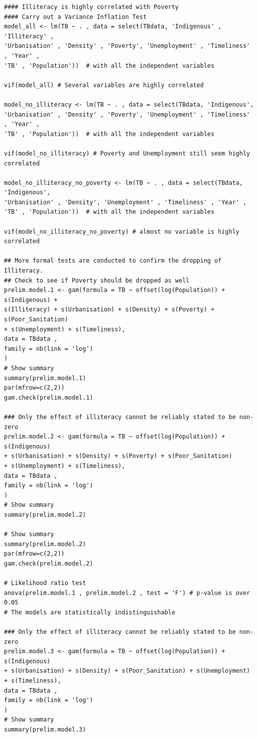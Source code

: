 \documentclass{article}
\begin{document}
\begin{verbatim}
#### Illiteracy is highly correlated with Poverty
#### Carry out a Variance Inflation Test
model_all <- lm(TB ~ . , data = select(TBdata, 'Indigenous' , 'Illiteracy' , 
'Urbanisation' , 'Density' , 'Poverty', 'Unemployment' , 'Timeliness' , 'Year' ,
'TB' , 'Population'))  # with all the independent variables

vif(model_all) # Several variables are highly correlated

model_no_illiteracy <- lm(TB ~ . , data = select(TBdata, 'Indigenous', 
'Urbanisation' , 'Density' , 'Poverty', 'Unemployment' , 'Timeliness' , 'Year' ,
'TB' , 'Population'))  # with all the independent variables

vif(model_no_illiteracy) # Poverty and Unemployment still seem highly correlated

model_no_illiteracy_no_poverty <- lm(TB ~ . , data = select(TBdata, 'Indigenous', 
'Urbanisation' , 'Density', 'Unemployment' , 'Timeliness' , 'Year' ,
'TB' , 'Population'))  # with all the independent variables

vif(model_no_illiteracy_no_poverty) # almost no variable is highly correlated

## More formal tests are conducted to confirm the dropping of Illiteracy.
## Check to see if Poverty should be dropped as well
prelim.model.1 <- gam(formula = TB ~ offset(log(Population)) + s(Indigenous) + 
s(Illiteracy) + s(Urbanisation) + s(Density) + s(Poverty) + s(Poor_Sanitation)
+ s(Unemployment) + s(Timeliness),
data = TBdata , 
family = nb(link = 'log')
)
# Show summary
summary(prelim.model.1)
par(mfrow=c(2,2))
gam.check(prelim.model.1)

### Only the effect of illiteracy cannot be reliably stated to be non-zero
prelim.model.2 <- gam(formula = TB ~ offset(log(Population)) + s(Indigenous) 
+ s(Urbanisation) + s(Density) + s(Poverty) + s(Poor_Sanitation)
+ s(Unemployment) + s(Timeliness),
data = TBdata , 
family = nb(link = 'log')
)
# Show summary
summary(prelim.model.2)

# Show summary
summary(prelim.model.2)
par(mfrow=c(2,2))
gam.check(prelim.model.2)

# Likelihood ratio test
anova(prelim.model.1 , prelim.model.2 , test = 'F') # p-value is over 0.05
# The models are statistically indistinguishable

### Only the effect of illiteracy cannot be reliably stated to be non-zero
prelim.model.3 <- gam(formula = TB ~ offset(log(Population)) + s(Indigenous) 
+ s(Urbanisation) + s(Density) + s(Poor_Sanitation) + s(Unemployment) 
+ s(Timeliness),
data = TBdata , 
family = nb(link = 'log')
)
# Show summary
summary(prelim.model.3)


\end{verbatim}
\end{document}
